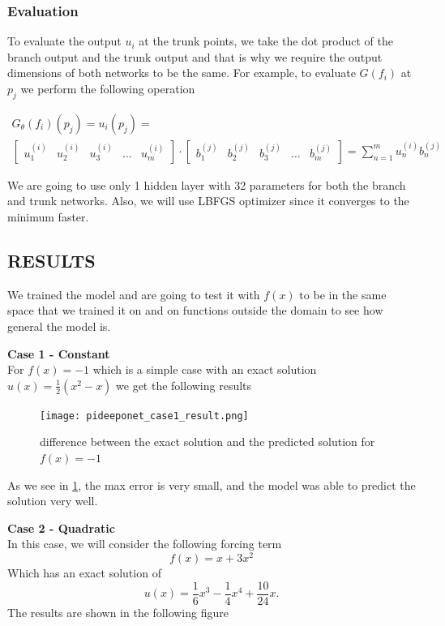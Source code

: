 \documentclass[a4paper,12pt]{article}
\theoremstyle{definition}
\begin{document}
\subsubsection{Evaluation}
To evaluate the output $u_i$ at the trunk points,
we take the dot product of the branch output and the trunk output and that is why we require the
output dimensions of both networks to be the same. For example,
to evaluate $G(f_i)$ at $p_j$ we perform the following operation

\begin{multline}
G_{\theta}(f_i)(p_j) = u_i(p_j) = \\ 
\begin{bmatrix}
u^{(i)}_1 & u^{(i)}_2 & u^{(i)}_3 & \dots & u^{(i)}_m
\end{bmatrix} \cdot 
\begin{bmatrix} 
b^{(j)}_1 & b^{(j)}_2 & b^{(j)}_3 & \dots & b^{(j)}_m
\end{bmatrix}
= \sum_{n=1}^{m} u^{(i)}_n b^{(j)}_n
\end{multline}

We are going to use only 1 hidden layer with 32 parameters for both the branch and trunk networks. 
Also, we will use LBFGS optimizer since it converges to the minimum faster.
\subsection{RESULTS}
We trained the model and are going to test it with $f(x)$ to be in the same space that we trained it on
and on functions outside the domain to see how general the model is.

\textbf{Case 1 - Constant}\\
For $f(x) = -1$ which is a simple case with an exact solution $u(x) = \frac{1}{2} (x^2 - x)$ we get the following results 

\begin{figure}[H]
    \centering 
    \texttt{[image: pideeponet\_case1\_result.png]}
    \label{constant_f}
    \caption[figure1]{difference between the exact solution and the predicted solution for $f(x) = -1$}
\end{figure}

As we see in \ref*{constant_f}, the max error is very small, and the model 
was able to predict the solution very well.

\textbf{Case 2 - Quadratic}\\
In this case, we will consider the following forcing term
\[ f(x) = x + 3x^2 \] 
Which has an exact solution of 
\[u(x) = \dfrac{1}{6} x^3 - \dfrac{1}{4} x^4 + \dfrac{10}{24} x. \] 
The results are shown in the following figure
\end{document}
